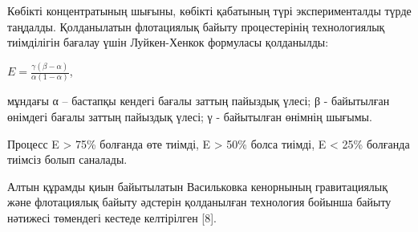 \begin{multicols}{2}

Көбікті концентратының шығыны, көбікті қабатының түрі эксперименталды
түрде таңдалды. Қолданылатын флотациялық байыту процестерінің
технологиялық тиімділігін бағалау үшін Луйкен-Хенкок формуласы
қолданылды:

\(E = \frac{\gamma(\beta - \alpha)}{\alpha(1 - \alpha)}\),

мұндағы α -- бастапқы кендегі бағалы заттың пайыздық үлесі; β -
байытылған өнімдегі бағалы заттың пайыздық үлесі; γ - байытылған өнімнің
шығымы.

Процесс E \textgreater{} 75\% болғанда өте тиімді, E \textgreater{} 50\%
болса тиімді, E \textless{} 25\% болғанда тиімсіз болып саналады.

Алтын құрамды қиын байытылатын Васильковка кенорнының гравитациялық және
флотациялық байыту әдстерін қолданылған технология бойынша байыту
нәтижесі төмендегі кестеде келтірілген {[}8{]}.
\end{multicols}

